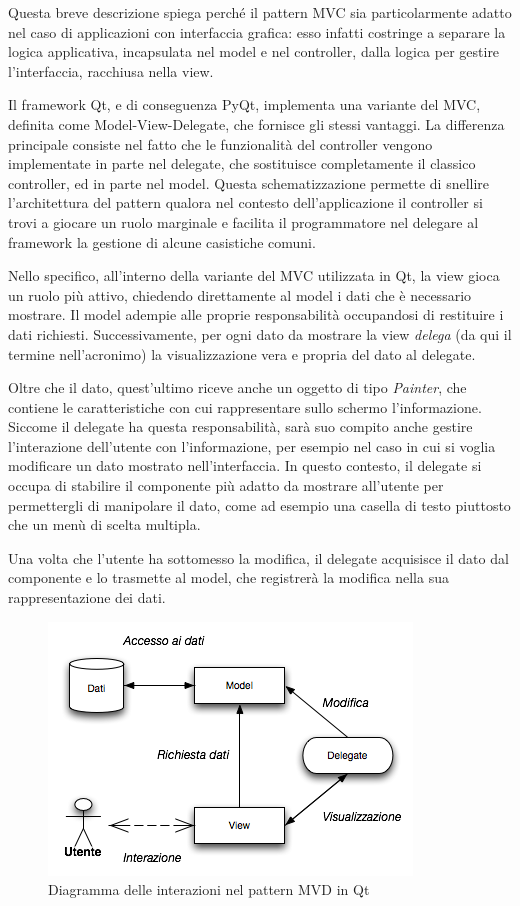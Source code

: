 Questa breve descrizione spiega perché il pattern MVC sia particolarmente adatto nel caso di applicazioni con interfaccia grafica: esso infatti costringe a separare la logica applicativa, incapsulata nel model e nel controller, dalla logica per gestire l'interfaccia, racchiusa nella view. 

Il framework Qt, e di conseguenza PyQt, implementa una variante del MVC, definita come Model-View-Delegate, che fornisce gli stessi vantaggi. La differenza principale consiste nel fatto che le funzionalità del controller vengono implementate in parte nel delegate, che sostituisce completamente il classico controller, ed in parte nel model. Questa schematizzazione permette di snellire l'architettura del pattern qualora nel contesto dell'applicazione il controller si trovi a giocare un ruolo marginale e facilita il programmatore nel delegare al framework la gestione di alcune casistiche comuni.

Nello specifico, all'interno della variante del MVC utilizzata in Qt, la view gioca un ruolo più attivo, chiedendo direttamente al model i dati che è necessario mostrare. Il model adempie alle proprie responsabilità occupandosi di restituire i dati richiesti. Successivamente, per ogni dato da mostrare la view \emph{delega} (da qui il termine nell'acronimo) la visualizzazione vera e propria del dato al delegate. 

Oltre che il dato, quest'ultimo riceve anche un oggetto di tipo \emph{Painter}, che contiene le caratteristiche con cui rappresentare sullo schermo l'informazione. Siccome il delegate ha questa responsabilità, sarà suo compito anche gestire l'interazione dell'utente con l'informazione, per esempio nel caso in cui si voglia modificare un dato mostrato nell'interfaccia. In questo contesto, il delegate si occupa di stabilire il componente più adatto da mostrare all'utente per permettergli di manipolare il dato, come ad esempio una casella di testo piuttosto che un menù di scelta multipla. 

Una volta che l'utente ha sottomesso la modifica, il delegate acquisisce il dato dal componente e lo trasmette al model, che registrerà la modifica nella sua rappresentazione dei dati. 

\begin{figure}[htbp]
\begin{center}
\includegraphics{images/mvd.png}
\caption{Diagramma delle interazioni nel pattern MVD in Qt}
\label{default}
\end{center}
\end{figure}


